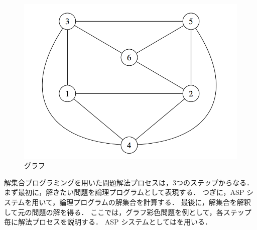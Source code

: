 
\begin{figure}[tb]
  \centering
  \includegraphics[width=0.6\linewidth]{fig/graph.png}
  \caption{グラフ}
  \label{fig:graph}
\end{figure}



解集合プログラミングを用いた問題解法プロセスは，3つのステップからなる．
まず最初に，解きたい問題を論理プログラムとして表現する．
つぎに，ASP システムを用いて，論理プログラムの解集合を計算する．
最後に，解集合を解釈して元の問題の解を得る．
%
ここでは，グラフ彩色問題を例として，各ステップ毎に解法プロセスを説明する．
ASP システムとしては{\clingo}を用いる．

